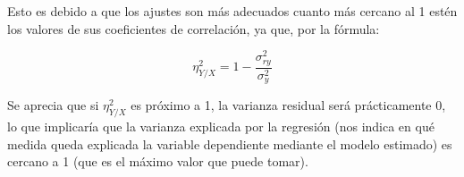 \documentclass[10pt,a4paper]{article}
\begin{document}
\begin{enumerate}
Esto es debido a que los ajustes son más adecuados cuanto más cercano al 1 estén los valores de sus coeficientes de correlación, ya que, por la fórmula:

\begin{equation*}
\eta_{Y / X}^2 = 1 - \dfrac{\sigma_{ry}^2}{\sigma_y^2}
\end{equation*}

Se aprecia que si $\eta_{Y/X}^2$ es próximo a 1, la varianza residual será prácticamente 0, lo que implicaría que la varianza explicada por la regresión (nos indica en qué medida queda explicada la variable dependiente mediante el modelo estimado) es cercano a 1 (que es el máximo valor que puede tomar). 


\end{enumerate}
\end{document}
